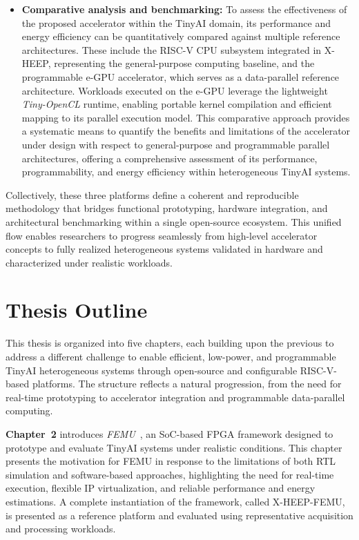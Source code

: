 \begin{itemize}
            \item \textbf{Comparative analysis and benchmarking:} To assess the effectiveness of the proposed accelerator within the TinyAI domain, its performance and energy efficiency can be quantitatively compared against multiple reference architectures. These include the RISC-V CPU subsystem integrated in \mbox{X-HEEP}, representing the general-purpose computing baseline, and the programmable \mbox{e-GPU} accelerator, which serves as a data-parallel reference architecture. Workloads executed on the \mbox{e-GPU} leverage the lightweight \emph{Tiny-OpenCL} runtime, enabling portable kernel compilation and efficient mapping to its parallel execution model. This comparative approach provides a systematic means to quantify the benefits and limitations of the accelerator under design with respect to general-purpose and programmable parallel architectures, offering a comprehensive assessment of its performance, programmability, and energy efficiency within heterogeneous TinyAI systems.
        \end{itemize}
        
        Collectively, these three platforms define a coherent and reproducible methodology that bridges functional prototyping, hardware integration, and architectural benchmarking within a single open-source ecosystem. This unified flow enables researchers to progress seamlessly from high-level accelerator concepts to fully realized heterogeneous systems validated in hardware and characterized under realistic workloads.
        
    \section{Thesis Outline}
        
        This thesis is organized into five chapters, each building upon the previous to address a different challenge to enable efficient, low-power, and programmable TinyAI heterogeneous systems through open-source and configurable RISC-V-based platforms. The structure reflects a natural progression, from the need for real-time prototyping to accelerator integration and programmable data-parallel computing.
        
        \noindent\textbf{Chapter~2} introduces \emph{FEMU}~\cite{femu}, an SoC-based FPGA framework designed to prototype and evaluate TinyAI systems under realistic conditions. This chapter presents the motivation for FEMU in response to the limitations of both RTL simulation and software-based approaches, highlighting the need for real-time execution, flexible IP virtualization, and reliable performance and energy estimations. A complete instantiation of the framework, called \mbox{X-HEEP-FEMU}, is presented as a reference platform and evaluated using representative acquisition and processing workloads.
        

